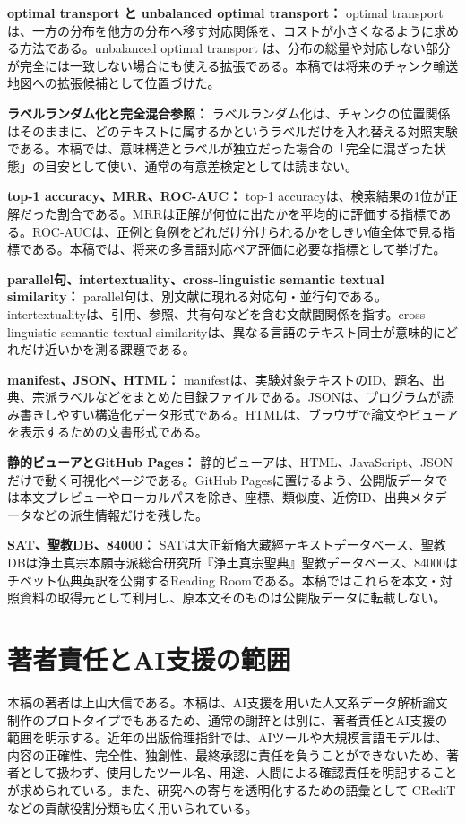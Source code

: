 \documentclass[uplatex,dvipdfmx,11pt,a4paper]{jsarticle}
\begin{document}
\noindent\textbf{optimal transport と unbalanced optimal transport：} optimal transport は、一方の分布を他方の分布へ移す対応関係を、コストが小さくなるように求める方法である。unbalanced optimal transport は、分布の総量や対応しない部分が完全には一致しない場合にも使える拡張である。本稿では将来のチャンク輸送地図への拡張候補として位置づけた。

\noindent\textbf{ラベルランダム化と完全混合参照：} ラベルランダム化は、チャンクの位置関係はそのままに、どのテキストに属するかというラベルだけを入れ替える対照実験である。本稿では、意味構造とラベルが独立だった場合の「完全に混ざった状態」の目安として使い、通常の有意差検定としては読まない。

\noindent\textbf{top-1 accuracy、MRR、ROC-AUC：} top-1 accuracyは、検索結果の1位が正解だった割合である。MRRは正解が何位に出たかを平均的に評価する指標である。ROC-AUCは、正例と負例をどれだけ分けられるかをしきい値全体で見る指標である。本稿では、将来の多言語対応ペア評価に必要な指標として挙げた。

\noindent\textbf{parallel句、intertextuality、cross-linguistic semantic textual similarity：} parallel句は、別文献に現れる対応句・並行句である。intertextualityは、引用、参照、共有句などを含む文献間関係を指す。cross-linguistic semantic textual similarityは、異なる言語のテキスト同士が意味的にどれだけ近いかを測る課題である。

\noindent\textbf{manifest、JSON、HTML：} manifestは、実験対象テキストのID、題名、出典、宗派ラベルなどをまとめた目録ファイルである。JSONは、プログラムが読み書きしやすい構造化データ形式である。HTMLは、ブラウザで論文やビューアを表示するための文書形式である。

\noindent\textbf{静的ビューアとGitHub Pages：} 静的ビューアは、HTML、JavaScript、JSONだけで動く可視化ページである。GitHub Pagesに置けるよう、公開版データでは本文プレビューやローカルパスを除き、座標、類似度、近傍ID、出典メタデータなどの派生情報だけを残した。

\noindent\textbf{SAT、聖教DB、84000：} SATは大正新脩大藏經テキストデータベース、聖教DBは浄土真宗本願寺派総合研究所『浄土真宗聖典』聖教データベース、84000はチベット仏典英訳を公開するReading Roomである。本稿ではこれらを本文・対照資料の取得元として利用し、原本文そのものは公開版データに転載しない。

\section*{著者責任とAI支援の範囲}

本稿の著者は上山大信である。本稿は、AI支援を用いた人文系データ解析論文制作のプロトタイプでもあるため、通常の謝辞とは別に、著者責任とAI支援の範囲を明示する。近年の出版倫理指針では、AIツールや大規模言語モデルは、内容の正確性、完全性、独創性、最終承認に責任を負うことができないため、著者として扱わず、使用したツール名、用途、人間による確認責任を明記することが求められている\cite{icmje-ai,elsevier-ai,springer-ai}。また、研究への寄与を透明化するための語彙として CRediT などの貢献役割分類も広く用いられている\cite{credit-taxonomy}。
\end{document}

